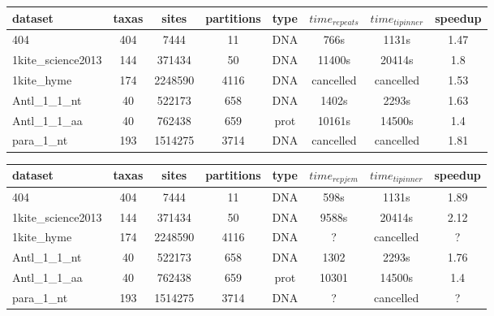 \documentclass[a4paper]{article}
\begin{document}
\begin{tabular}{|l|c|c|c|c|c|c|c|}
\hline dataset                    & taxas & sites    & partitions & type & $time_{repeats}$ & $time_{tipinner}$ & speedup\\
\hline 404                        & 404   &  7444    & 11         & DNA  & 766s             &  1131s            & 1.47  \\
\hline 1kite\_science2013         & 144   &  371434  & 50         & DNA  & 11400s           &  20414s           & 1.8  \\
\hline 1kite\_hyme                & 174   &  2248590 & 4116       & DNA  & cancelled        &  cancelled        & 1.53 \\
\hline Antl\_1\_1\_nt             & 40    &  522173  & 658        & DNA  & 1402s            &  2293s            & 1.63  \\
\hline Antl\_1\_1\_aa             & 40    &  762438  & 659        & prot & 10161s           & 14500s            & 1.4 \\
\hline para\_1\_nt                & 193   &  1514275 & 3714       & DNA  & cancelled        &  cancelled        & 1.81  \\
\hline 
\end{tabular}\newline
\newline


\begin{tabular}{|l|c|c|c|c|c|c|c|}
\hline dataset                    & taxas & sites    & partitions & type & $time_{rep jem}$ & $time_{tipinner}$ & speedup\\
\hline 404                        & 404   &  7444    & 11         & DNA  & 598s      &  1131s            & 1.89 \\
\hline 1kite\_science2013         & 144   &  371434  & 50         & DNA  & 9588s     &  20414s           & 2.12 \\
\hline 1kite\_hyme                & 174   &  2248590 & 4116       & DNA  & ?         &  cancelled        & ? \\
\hline Antl\_1\_1\_nt             & 40    &  522173  & 658        & DNA  & 1302      &  2293s            & 1.76 \\
\hline Antl\_1\_1\_aa             & 40    &  762438  & 659        & prot & 10301     &  14500s           & 1.4 \\
\hline para\_1\_nt                & 193   &  1514275 & 3714       & DNA  & ?         &  cancelled        & ? \\
\hline 
\end{tabular}\newline
\newline
\end{document}
